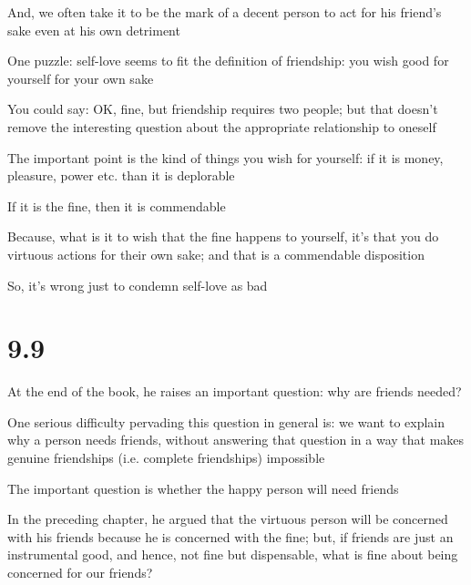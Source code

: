 \documentclass[11pt]{article}
\begin{document}
\noindent And, we often take it to be the mark of a decent person to act for his friend's sake even at his own detriment
\vspace*{2mm}

\noindent One puzzle: self-love seems to fit the definition of friendship: you wish good for yourself for your own sake
\vspace*{2mm}

\noindent You could say: OK, fine, but friendship requires two people; but that doesn't remove the interesting question about the appropriate relationship to oneself
\vspace*{2mm}

\noindent The important point is the kind of things you wish for yourself: if it is money, pleasure, power etc. than it is deplorable
\vspace*{2mm}

\noindent If it is the fine, then it is commendable
\vspace*{2mm}

\noindent Because, what is it to wish that the fine happens to yourself, it's that you do virtuous actions for their own sake; and that is a commendable disposition
\vspace*{2mm}

\noindent So, it's wrong just to condemn self-love as bad

\section{9.9}

\noindent At the end of the book, he raises an important question: why are friends needed?
\vspace*{2mm}

\noindent One serious difficulty pervading this question in general is: we want to explain why a person needs friends, without answering that question in a way that makes genuine friendships (i.e. complete friendships) impossible
\vspace*{2mm}

\noindent The important question is whether the happy person will need friends
\vspace*{2mm}

\noindent In the preceding chapter, he argued that the virtuous person will be concerned with his friends because he is concerned with the fine; but, if friends are just an instrumental good, and hence, not fine but dispensable, what is fine about being concerned for our friends?
\vspace*{2mm}
\end{document}
